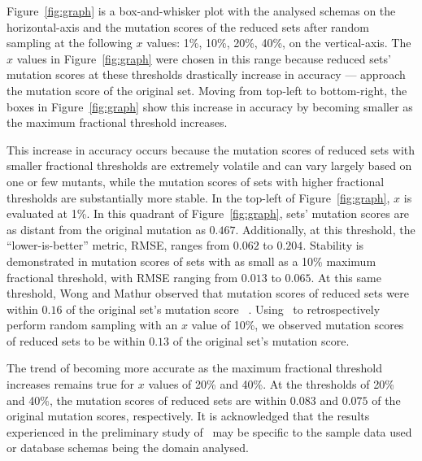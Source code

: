 Figure~\ref{fig:graph} is a box-and-whisker plot with the analysed schemas on the horizontal-axis and the mutation scores of the reduced
sets after random sampling at the following $x$ values: 1\%, 10\%, 20\%, 40\%, on the vertical-axis. The $x$ values in Figure~\ref{fig:graph}
were chosen in this range because reduced sets' mutation scores at these thresholds drastically increase in accuracy --- approach the mutation
score of the original set. Moving from top-left to bottom-right, the boxes in Figure~\ref{fig:graph} show this increase in accuracy by becoming
smaller as the maximum fractional threshold increases.

This increase in accuracy occurs because the mutation scores of reduced sets with smaller fractional thresholds are extremely volatile and can
vary largely based on one or few mutants, while the mutation scores of sets with higher fractional thresholds are substantially more stable. In
the top-left of Figure~\ref{fig:graph}, $x$ is evaluated at 1\%. In this quadrant of Figure~\ref{fig:graph}, sets' mutation scores are as distant
from the original mutation as $0.467$. Additionally, at this threshold, the ``lower-is-better'' metric, RMSE, ranges from $0.062$ to $0.204$.
Stability is demonstrated in mutation scores of sets with as small as a 10\% maximum fractional threshold, with RMSE ranging from $0.013$ to $0.065$.
At this same threshold, Wong and Mathur observed that mutation scores of reduced sets were within $0.16$ of the original set's mutation score
~\cite{mathur1994empirical, wong1993mutation}. Using \mr~to retrospectively perform random sampling with an $x$ value of 10\%, we observed mutation
scores of reduced sets to be within $0.13$ of the original set's mutation score.

The trend of becoming more accurate as the maximum fractional threshold increases remains true for $x$ values of 20\% and 40\%. At the thresholds of
20\% and 40\%, the mutation scores of reduced sets are within $0.083$ and $0.075$ of the original mutation scores, respectively. It is acknowledged
that the results experienced in the preliminary study of \mr~may be specific to the sample data used or database schemas being the domain analysed.


